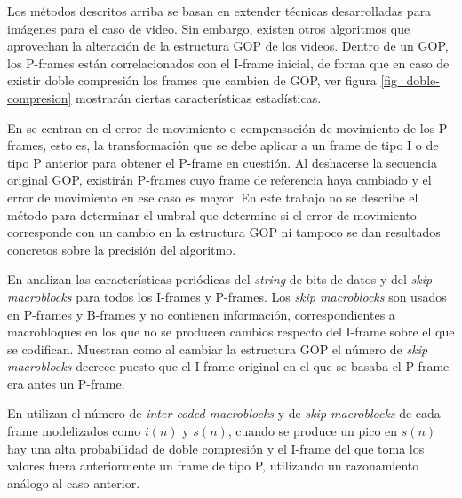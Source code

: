 Los métodos descritos arriba se basan en extender técnicas desarrolladas para imágenes para el caso de video. Sin embargo, existen otros algoritmos que aprovechan la alteración de la estructura GOP de los videos. Dentro de un GOP, los P-frames están correlacionados con el I-frame inicial, de forma que en caso de existir doble compresión los frames que cambien de GOP, ver figura \ref{fig_doble-compresion} mostrarán ciertas características estadísticas.

En \cite{farid:2009} se centran en el error de movimiento o compensación de movimiento de los P-frames, esto es, la transformación que se debe aplicar a un frame de tipo I o de tipo P anterior para obtener el P-frame en cuestión. Al deshacerse la secuencia original GOP, existirán P-frames cuyo frame de referencia haya cambiado y el error de movimiento en ese caso es mayor. En este trabajo no se describe el método para determinar el umbral que determine si el error de movimiento corresponde con un cambio en la estructura GOP ni tampoco se dan resultados concretos sobre la precisión del algoritmo. 

En \cite{yao:2017} analizan las características periódicas del \textit{string} de bits de datos y del \textit{skip macroblocks} para todos los I-frames y P-frames. Los \textit{skip macroblocks} son usados en P-frames y B-frames y no contienen información, correspondientes a macrobloques en los que no se producen cambios respecto del I-frame sobre el que se codifican. Muestran como al cambiar la estructura GOP el número de \textit{skip macroblocks} decrece puesto que el I-frame original en el que se basaba el P-frame era antes un P-frame.

En \cite{vazquez:2012} utilizan el número de \textit{inter-coded macroblocks} y de \textit{skip macroblocks} de cada frame modelizados como $i(n)$ y $s(n)$, cuando se produce un pico en $s(n)$ hay una alta probabilidad de doble compresión y el I-frame del que toma los valores fuera anteriormente un frame de tipo P, utilizando un razonamiento análogo al caso anterior. \\

